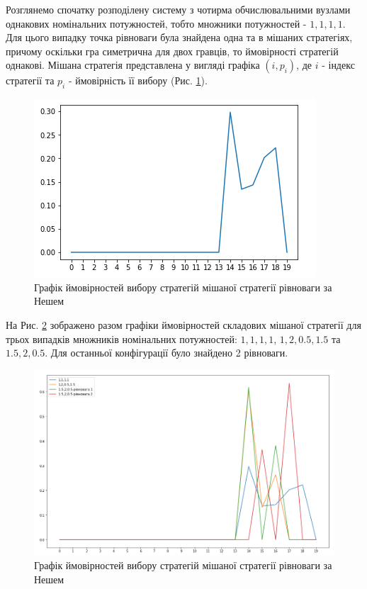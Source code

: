 Розглянемо спочатку розподілену систему з чотирма обчислювальними вузлами однакових номінальних потужностей, тобто множники потужностей - $1,1,1,1$. Для цього випадку точка рівноваги була знайдена одна та в мішаних стратегіях, причому оскільки гра симетрична для двох гравців, то ймовірності стратегій однакові. Мішана стратегія представлена у вигляді графіка $(i, p_i)$, де $i$ - індекс стратегії та $p_i$ - ймовірність її вибору (Рис. \ref{fig:nash_strategy_equal}).

\begin{figure}[H]
	\centering
	\includegraphics[width=\textwidth]{practice/img/nash_strategy_equal}
	\caption{Графік ймовірностей вибору стратегій мішаної стратегії рівноваги за Нешем}
	\label{fig:nash_strategy_equal}
\end{figure}

На Рис. \ref{fig:nash_strategy_together} зображено разом графіки ймовірностей складових мішаної стратегії для трьох випадків множників номінальних потужностей: $1,1,1,1$, $1,2,0.5,1.5$ та $1.5,2,0.5$. Для останньої конфігурації було знайдено 2 рівноваги.

\begin{figure}[H]
	\centering
	\includegraphics[width=\textwidth]{practice/img/nash_strategy_together}
	\caption{Графік ймовірностей вибору стратегій мішаної стратегії рівноваги за Нешем}
	\label{fig:nash_strategy_together}
\end{figure}






